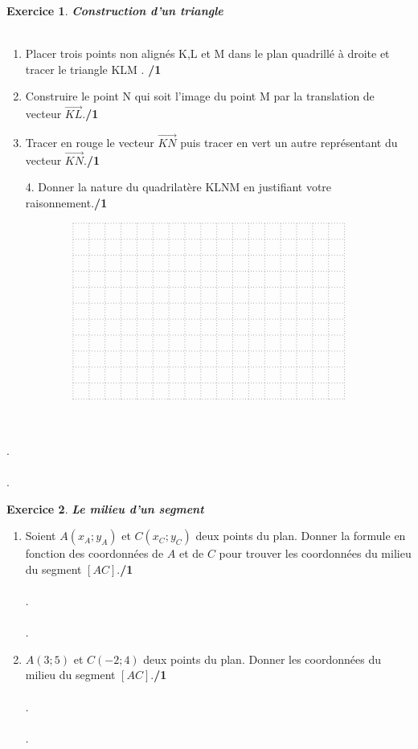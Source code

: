 \documentclass[a4paper,10pt]{article}
\theoremstyle{definition}
\newtheorem{exo}{Exercice}
\newcommand{\V}{\overrightarrow}
\begin{document}
\begin{exo} \textit{\textbf{Construction d'un triangle}}\\\\
\begin{minipage}[t]{1\linewidth}
\begin{minipage}[c]{0.45\linewidth}
\begin{enumerate}
\item Placer trois points non alignés K,L et M dans le plan quadrillé à droite et tracer le triangle KLM . \hfill\textbf{/1} \\
\item Construire le point N qui soit l'image du point M par la translation de vecteur $\V{KL}$.\hfill\textbf{/1} \\
\item Tracer en rouge le vecteur $\V{KN}$ puis tracer en vert un autre représentant du vecteur $\V{KN}$.\hfill\textbf{/1}\\
\item[4.] Donner la nature du quadrilatère KLNM en justifiant votre raisonnement.\hfill\textbf{/1}\\
\end{enumerate} 
\end{minipage} 
\hfill
\begin{minipage}[c]{0.45\linewidth}
 $$\begin{tikzpicture}[scale=0.5]
\draw[dotted] (0,0) grid (17,11);
\end{tikzpicture}$$	  
\end{minipage}

    \hfill\\\hfill\\
    .\dotfill \\\\
    .\dotfill

\end{minipage}

\end{exo}
\begin{exo} \textit{\textbf{Le milieu d'un segment}}\\
\begin{enumerate}
    \item Soient $A \left(x_A;y_A\right)$ et $C \left(x_C;y_C\right)$ deux points du plan. Donner la formule en fonction des coordonnées de $A$ et de $C$ pour trouver les coordonnées du milieu du segment $[AC]$.\hfill\textbf{/1}\\\\
 .\dotfill \\\\
  .\dotfill \\
 \item $A \left(3;5\right)$ et $C \left(-2;4\right)$ deux points du plan. Donner les coordonnées du milieu du segment $[AC]$.\hfill\textbf{/1}\\\\
 .\dotfill \\\\
 .\dotfill 
\end{enumerate}

\end{exo}
\end{document}

